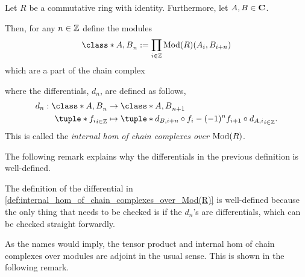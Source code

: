 \begin{definition}
    \label{def:internal_hom_of_chain_complexes_over_Mod(R)}
    Let \( R \) be a commutative ring with identity. Furthermore, let \( A, B \in \operatorname{\mathbf{C}} \).

    Then, for any \( n \in {\mathbb{Z}} \) define the modules
    \[
        \class*{A, B}_n := \prod_{i \in \Zb} \Mod(R)(A_i, B_{i + n})
    \]
    which are a part of the chain complex
    \begin{center}
    \end{center}

    where the differentials, \( d_n \), are defined as follows,
    \begin{align*}
        d_n : \class*{A, B}_n &\to \class*{A, B}_{n + 1} \\
        \tuple*{f_i}_{i \in \Zb} &\mapsto \tuple*{d_{B, i + n} \circ f_i - (-1)^n f_{i + 1} \circ d_{A, i}}_{i \in \Zb}.
    \end{align*}
    This is called the \emph{internal hom of chain complexes over \( \operatorname{Mod}(R) \)}.
\end{definition}

The following remark explains why the differentials in the previous definition is well-defined.

\begin{remark}
    The definition of the differential in \autoref{def:internal_hom_of_chain_complexes_over_Mod(R)} is well-defined because the only thing that needs to be checked is if the \( d_n \)'s are differentials, which can be checked straight forwardly.
\end{remark}

As the names would imply, the tensor product and internal hom of chain complexes over modules are adjoint in the usual sense. This is shown in the following remark.

